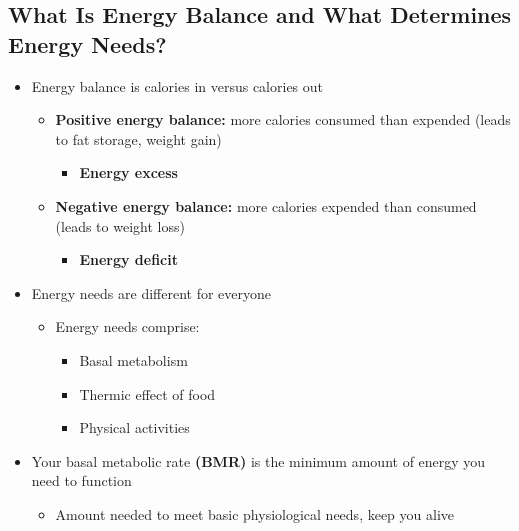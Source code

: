 \documentclass[12pt]{article}
\begin{document}
        \subsection{What Is Energy Balance and What Determines Energy Needs?}
            \begin{itemize}
                \item Energy balance is calories in versus calories out
                    \begin{itemize}
                        \item \textbf{Positive energy balance:} more calories consumed than expended (leads to fat storage, weight gain)
                            \begin{itemize}
                                \item \textbf{Energy excess}
                            \end{itemize}
                        \item \textbf{Negative energy balance:} more calories expended than consumed (leads to weight loss)
                            \begin{itemize}
                                \item \textbf{Energy deficit}
                            \end{itemize}
                    \end{itemize}
                \item Energy needs are different for everyone
                    \begin{itemize}
                        \item Energy needs comprise:
                            \begin{itemize}
                                \item Basal metabolism
                                \item Thermic effect of food
                                \item Physical activities
                            \end{itemize}
                    \end{itemize}
                \item Your basal metabolic rate \textbf{(BMR)} is the minimum amount of energy you need to function
                    \begin{itemize}
                        \item Amount needed to meet basic physiological needs, keep you alive

\end{itemize}
\end{itemize}
\end{document}
